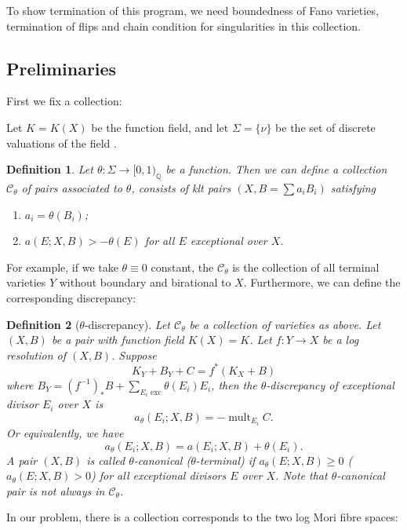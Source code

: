 \documentclass[11pt]{amsart}
\newtheorem{defn}{Definition}[section]
\begin{document}
To show termination of this program, we need boundedness of Fano varieties, termination of flips and chain condition for singularities in this collection. 

\subsection{Preliminaries}

First we fix a collection: 

Let $ K=K(X) $ be the function field, and let $ \Sigma=\{\nu\} $ be the set of discrete valuations of the field . 
\begin{defn}\label{thetacategory}
  \cite[Definition 3.5]{brunoLogSarkisovProgram1995}
  Let  $\theta:\Sigma\to [0,1)_\mathbb{Q}$ be a function. Then we can define a collection $ \mathcal{C}_\theta $ of pairs  associated to $ \theta $, consists of klt pairs $ (X,B=\sum a_iB_i) $ satisfying
  \begin{enumerate}
    \item $ a_i=\theta(B_i) $;
    \item $ a(E;X,B)>-\theta(E) $ for all $ E $ exceptional over $ X $.
  \end{enumerate} 
\end{defn}
For example, if we take $\theta \equiv 0$ constant, the $\mathcal{C}_{\theta}$ is the collection of all terminal varieties $Y$ without boundary and birational to $X$. Furthermore, we can define the corresponding discrepancy:
\begin{defn}[$\theta$-discrepancy]
  Let $\mathcal{C}_{\theta}$ be a collection of varieties as above. Let $(X,B)$ be a pair with function field $K(X)=K$. Let  $f:Y\to X$ be a log resolution of $(X,B)$. Suppose
  \[
  K_{Y}+B_{Y}+C=f^*(K_{X}+B)
  \]
  where $B_{Y}=(f^{-1})_*B+ \sum_{E_{i}\text{ exc}} \theta(E_{i})E_{i}$, then the $\theta$-discrepancy  of exceptional divisor $E_{i}$ over $X$ is 
  \[
    a_{\theta}(E_{i};X,B)=-\operatorname{mult}_{E_{i}}C.
  \]
 Or equivalently, we have 
 \[
    a_{\theta}(E_{i};X,B)=a(E_{i};X,B)+\theta(E_{i}).
 \]
A pair $(X,B)$ is called $\theta$-canonical ($\theta$-terminal) if $a_{\theta}(E;X,B)\geqslant 0$ ($a_{\theta}(E;X,B)> 0$) for all exceptional  divisors $E$ over $X$.  Note that $\theta$-canonical pair is not always in $\mathcal{C}_{\theta}$.
\end{defn}
In our problem, there is a collection corresponds to the two log Mori fibre spaces:
\end{document}

